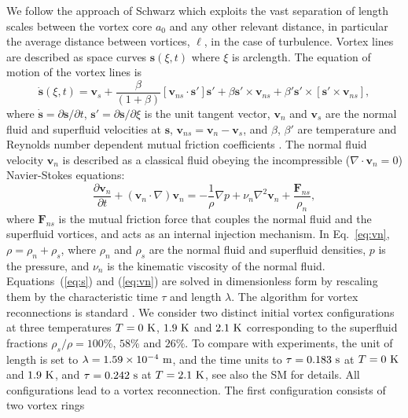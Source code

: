 \documentclass[9pt,twocolumn,twoside]{pnas-new}
\def\s{\mathbf{s}}
\def\v{\mathbf{v}}
\begin{document}
{We follow the approach of Schwarz \cite{schwarz1988} which exploits
the vast separation of length scales between the vortex core $a_0$ and any
other relevant distance, in particular the average distance between vortices,
$\ell$, in the case of turbulence. Vortex lines are described
as space curves $\s(\xi,t)$ where $\xi$ is arclength. The equation of motion 
of the vortex lines is
\begin{equation}
\label{eq:s}
	\dot{\s}(\xi,t) = \v_s + \frac{\beta}{(1+\beta)}\left[\v_{ns}\cdot \s'\right]\s' + \beta\s'\times\v_{ns}+\beta'\s'\times\left[\s'\times \v_{ns}\right],
\end{equation}
%
where $\dot{\s}=\partial\s/\partial t$, $\s'=\partial\s/\partial \xi$ 
is the unit tangent vector, 
$\v_n$ and $\v_s$ are the normal fluid and superfluid velocities at $\s$,
$\v_{ns}=\v_n - \v_s$, and $\beta$, $\beta'$ are temperature and Reynolds number dependent 
mutual friction coefficients \cite{galantucciNewSelfconsistentApproach2020b}. The normal fluid velocity $\v_n$ is described as a classical fluid obeying the incompressible ($\nabla\cdot\v_n=0$) Navier-Stokes equations:
%
\begin{equation}
	\frac{\partial \v_n}{\partial t} + (\v_n\cdot\nabla)\v_n = 
        -\frac{1}{\rho} \nabla p + \nu_n\nabla^2\v_n + \frac{\mathbf{F}_{ns}}{\rho_n},
        \label{eq:vn}
\end{equation}
where $\mathbf{F}_{ns}$ is the mutual friction force that couples the normal fluid and the superfluid vortices, and acts as an internal injection mechanism. In Eq.~\eqref{eq:vn}, $\rho=\rho_n + \rho_s$, where $\rho_n$ and $\rho_s$ are the normal fluid and superfluid densities, $p$ is the pressure, 
and $\nu_n$ is the kinematic viscosity of the normal fluid. 
Equations~(\ref{eq:s}) and (\ref{eq:vn})
are solved in dimensionless form by rescaling them by the characteristic time $\tau$ and length $\lambda$. 
The algorithm for vortex reconnections is standard
\cite{baggaleySensitivityVortexFilament2012a}. We consider two distinct initial vortex configurations
at three temperatures $T=0~\rm K$, $1.9~\rm K$ and $2.1~\rm K$
corresponding to the superfluid fractions $\rho_s/\rho=100 \%$,
$58 \%$ and $26 \%$. To compare with experiments, the unit of length is set to $\lambda=1.59 \times 10^{-4}~\rm m$, and the time units to $\tau=0.183~\rm s$ at $T=0~\rm K$ and $1.9~\rm K$, and $\tau=0.242~\rm s$ at $T=2.1~\rm K$, 
see also the SM for details.
All configurations lead to a vortex reconnection.
The first configuration consists of two vortex rings 
}
\end{document}
